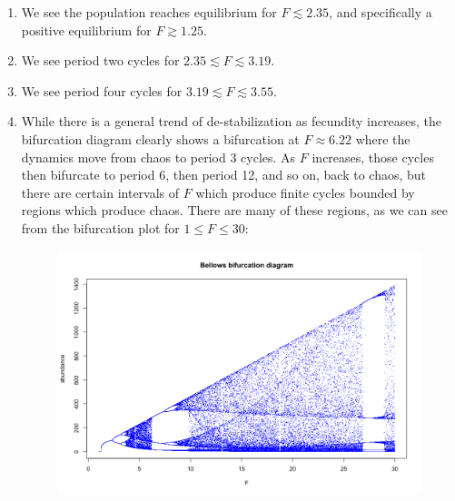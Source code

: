 \documentclass{article} %
\theoremstyle{plain}
\numberwithin{equation}{section} %
\numberwithin{figure}{section} %
\numberwithin{table}{section} %
\begin{document}
\begin{enumerate}[\ \ (a)]
        \begin{enumerate}[\ \ \ (i)]
            \item We see the population reaches equilibrium for $F \lesssim 2.35$, and specifically a positive equilibrium for $F \gtrsim 1.25$.
            \item We see period two cycles for $2.35 \lesssim F \lesssim 3.19$.
            \item We see period four cycles for $3.19 \lesssim F \lesssim 3.55$.
            \item While there is a general trend of de-stabilization as fecundity increases, the bifurcation diagram clearly shows a bifurcation at $F \approx 6.22$ where the dynamics move from chaos to period 3 cycles.  As $F$ increases, those cycles then bifurcate to period 6, then period 12, and so on, back to chaos, but there are certain intervals of $F$ which produce finite cycles bounded by regions which produce chaos.  There are many of these regions, as we can see from the bifurcation plot for $1 \leq F \leq 30$:
            \begin{figure}[ht!]
                \centering
                \includegraphics[scale=0.3]{4div.png}
            \end{figure}
        \end{enumerate}
        
\end{enumerate}
\end{document}
